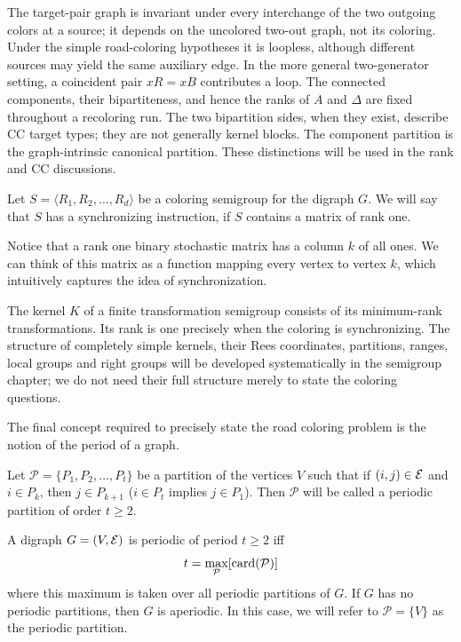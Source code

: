 \begin{remark}
The target-pair graph is invariant under every interchange of the two
outgoing colors at a source; it depends on the uncolored two-out graph,
not its coloring. Under the simple road-coloring hypotheses it is loopless,
although different sources may yield the same auxiliary edge. In the more
general two-generator setting, a coincident pair $xR=xB$ contributes a loop.
The connected components, their bipartiteness, and hence the ranks of $A$
and $\Delta$ are fixed throughout a recoloring run. The two bipartition
sides, when they exist, describe CC target types; they are not generally
kernel blocks. The component partition is the graph-intrinsic canonical
partition. These distinctions will be used in the rank and CC discussions.
\end{remark}



\begin{definition}	\label{defn:2}
	Let $S = \langle R_1,R_2,\ldots,R_d\rangle$ be a coloring semigroup for the digraph $G$.
We will say that $S$ has a synchronizing instruction, if $S$ contains a matrix of rank one.
\end{definition}

Notice that a rank one binary stochastic matrix has a column $k$ of all ones.  
We can think of this matrix as a function mapping every vertex to vertex $k$, which intuitively captures the idea of synchronization.

The kernel $K$ of a finite transformation semigroup consists of its
minimum-rank transformations. Its rank is one precisely when the coloring
is synchronizing. The structure of completely simple kernels, their Rees
coordinates, partitions, ranges, local groups and right groups will be
developed systematically in the semigroup chapter; we do not need their
full structure merely to state the coloring questions.

The final concept required to precisely state the road coloring problem is the notion of the period of a graph.

\begin{definition}    \label{defn:3}  
	Let $\mathcal P = \{ P_1,P_2,\ldots,P_t \}$ be a partition of the vertices $V$ such that if $(i,j) \in {\mathcal E }$ and $i \in P_k$, then $j \in P_{k+1}$ ($i \in P_t$ implies $j \in P_1$).  Then $\mathcal P$ will be called a periodic partition of order $t \ge 2$.
\end{definition}

\begin{definition}    \label{defn:4}  
	A digraph $G=(V,{\mathcal E })$ is periodic of period $t\ge 2$ iff 
$$
	t = \max_\mathcal P [\hbox{card}(\mathcal P)]
$$
where this maximum is taken over all periodic partitions of $G$. 
If $G$ has no periodic partitions, then $G$ is aperiodic.
In this case, we will refer to $\mathcal P = \{V\}$ as the periodic partition.
\end{definition}

